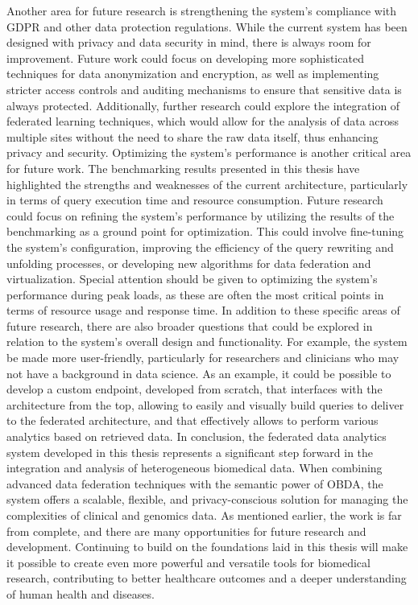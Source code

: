 Another area for future research is strengthening the system's compliance with \ac{GDPR} and other data protection regulations. While the current system has been designed with privacy and data security in mind, there is always room for improvement. Future work could focus on developing more sophisticated techniques for data anonymization and encryption, as well as implementing stricter access controls and auditing mechanisms to ensure that sensitive data is always protected. Additionally, further research could explore the integration of federated learning techniques, which would allow for the analysis of data across multiple sites without the need to share the raw data itself, thus enhancing privacy and security.
Optimizing the system's performance is another critical area for future work. The benchmarking results presented in this thesis have highlighted the strengths and weaknesses of the current architecture, particularly in terms of query execution time and resource consumption. Future research could focus on refining the system's performance by utilizing the results of the benchmarking as a ground point for optimization. This could involve fine-tuning the system's configuration, improving the efficiency of the query rewriting and unfolding processes, or developing new algorithms for data federation and virtualization. Special attention should be given to optimizing the system's performance during peak loads, as these are often the most critical points in terms of resource usage and response time.
In addition to these specific areas of future research, there are also broader questions that could be explored in relation to the system's overall design and functionality. For example, the system be made more user-friendly, particularly for researchers and clinicians who may not have a background in data science. As an example, it could be possible to develop a custom endpoint, developed from scratch, that interfaces with the architecture from the top, allowing to easily and visually build queries to deliver to the federated architecture, and that effectively allows to perform various analytics based on retrieved data.
In conclusion, the federated data analytics system developed in this thesis represents a significant step forward in the integration and analysis of heterogeneous biomedical data. When combining advanced data federation techniques with the semantic power of \ac{OBDA}, the system offers a scalable, flexible, and privacy-conscious solution for managing the complexities of clinical and genomics data. As mentioned earlier, the work is far from complete, and there are many opportunities for future research and development. Continuing to build on the foundations laid in this thesis will make it possible to create even more powerful and versatile tools for biomedical research, contributing to better healthcare outcomes and a deeper understanding of human health and diseases.